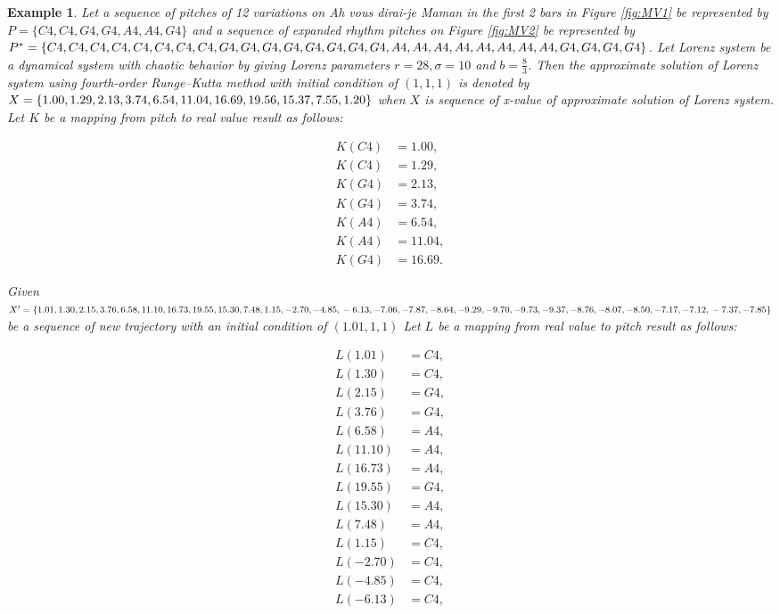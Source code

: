 \documentclass[11pt]{article}
\newtheorem{example}{Example}
\begin{document}
\begin{example}
Let a sequence of pitches of 12 variations on Ah vous dirai-je Maman in the first 2 bars in Figure \ref{fig:MV1} be represented by $P = \{C4, C4, G4, G4, A4, A4, G4 \}$ and a sequence of expanded rhythm pitches on Figure \ref{fig:MV2} be represented by $P^* = \{C4, C4, C4, C4, C4, C4, C4, C4, G4, G4, G4, \\ G4, G4, G4, G4, G4, A4, A4, A4, A4, A4, A4, A4, A4, G4, G4, G4, G4 \}$. Let Lorenz system be a dynamical system with chaotic behavior by giving Lorenz parameters $r = 28, \sigma=10$ and $b = \frac{8}{3} $. Then the approximate solution of Lorenz system using fourth-order Runge–Kutta method with initial condition of $(1,1,1)$ is denoted by $X = \{1.00, 1.29, 2.13, 3.74, 6.54, 11.04, 16.69, 19.56, \\ 15.37, 7.55, 1.20\}$ when $X$ is sequence of x-value of approximate solution of Lorenz system. Let $K$ be a mapping from pitch to real value result as follows:

\begin{align*}
K(C4) &= 1.00, \\ 
K(C4) &= 1.29, \\
K(G4) &= 2.13, \\
K(G4) &= 3.74, \\
K(A4) &= 6.54, \\
K(A4) &= 11.04, \\
K(G4) &= 16.69.
\end{align*}

Given $X^\prime = \{1.01, 1.30, 2.15, 3.76, 6.58, 11.10, 16.73, 19.55, 15.30, 7.48, 1.15, -2.70, -4.85, \\ -6.13, -7.06, -7.87, -8.64, -9.29, -9.70, -9.73, -9.37, -8.76, -8.07, -8.50, -7.17, -7.12, \\ -7.37, -7.85 \}$ be a sequence of new trajectory with an initial condition of $(1.01,1,1)$ Let $L$ be a mapping from real value to pitch result as follows:

\begin{multicols}{2}

\begin{align*}
L(1.01) &= C4, \\
L(1.30) &= C4, \\
L(2.15) &= G4, \\
L(3.76) &= G4, \\
L(6.58) &= A4, \\
L(11.10) &= A4, \\
L(16.73) &= A4, \\
L(19.55) &= G4, \\
L(15.30) &= A4, \\
L(7.48) &= A4, \\
L(1.15) &= C4, \\
L(-2.70) &= C4, \\
L(-4.85) &= C4, \\
L(-6.13) &= C4,
\end{align*}


\end{multicols}
\end{example}
\end{document}
